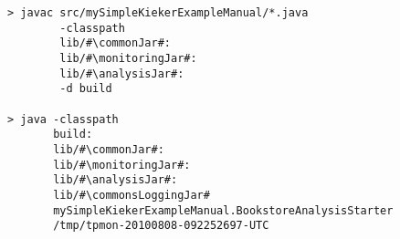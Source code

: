 \begin{lstlisting}[caption=Compile and run under Linux] 			
> javac src/mySimpleKiekerExampleManual/*.java
        -classpath	
        lib/#\commonJar#:
        lib/#\monitoringJar#:
        lib/#\analysisJar#:
        -d build

> java -classpath
       build:
       lib/#\commonJar#:
       lib/#\monitoringJar#:
       lib/#\analysisJar#:
       lib/#\commonsLoggingJar#
       mySimpleKiekerExampleManual.BookstoreAnalysisStarter 
       /tmp/tpmon-20100808-092252697-UTC
\end{lstlisting}	

